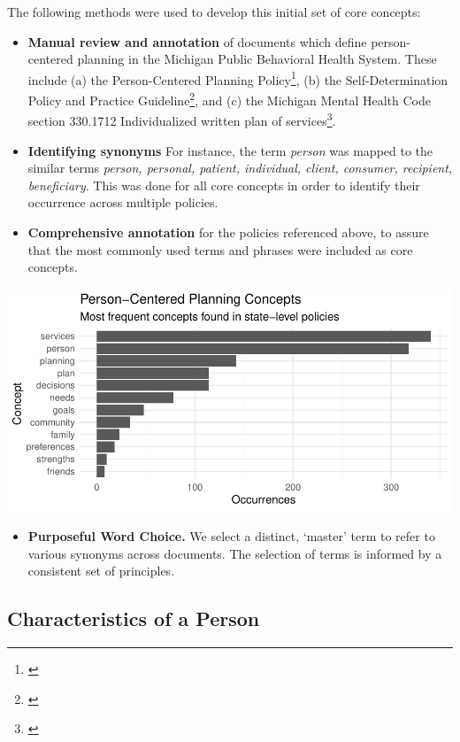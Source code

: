 \documentclass[
]{book}
\providecommand{\tightlist}{%
  \setlength{\itemsep}{0pt}\setlength{\parskip}{0pt}}
\begin{document}
The following methods were used to develop this initial set of core concepts:

\begin{itemize}
\tightlist
\item
  \textbf{Manual review and annotation} of documents which define person-centered planning in the Michigan Public Behavioral Health System. These include (a) the Person-Centered Planning Policy\footnote{\citet{pcp-policy}}, (b) the Self-Determination Policy and Practice Guideline\footnote{\citet{sd-policy}}, and (c) the Michigan Mental Health Code section 330.1712 Individualized written plan of services\footnote{\citet{mi-mhc}}.
\item
  \textbf{Identifying synonyms} For instance, the term \emph{person} was mapped to the similar terms \emph{person, personal, patient, individual, client, consumer, recipient, beneficiary}. This was done for all core concepts in order to identify their occurrence across multiple policies.
\item
  \textbf{Comprehensive annotation} for the policies referenced above, to assure that the most commonly used terms and phrases were included as core concepts.
\end{itemize}

\includegraphics{person_centered_files/figure-latex/plot_concept-1.pdf}

\begin{itemize}
\tightlist
\item
  \textbf{Purposeful Word Choice.} We select a distinct, `master' term to refer to various synonyms across documents. The selection of terms is informed by a consistent set of principles.
\end{itemize}

\hypertarget{characteristics-of-a-person}{%
\subsection{Characteristics of a Person}\label{characteristics-of-a-person}}
\end{document}
